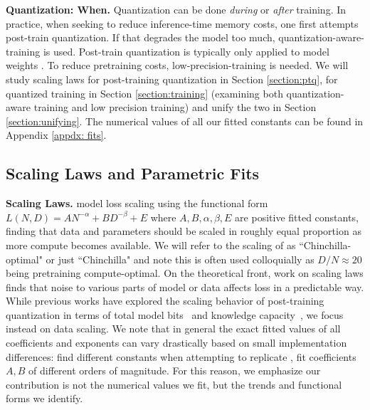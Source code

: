 \documentclass[11pt]{article}
\begin{document}
\textbf{Quantization: When.} Quantization can be done \textit{during} or \textit{after} training. In practice, when seeking to reduce inference-time memory costs, one first attempts post-train quantization. If that degrades the model too much, quantization-aware-training is used. Post-train quantization is typically only applied to model weights \citep{frantar2022gptq, dettmers2022gpt3, lin2023awq, xiao2023smoothquant}. To reduce pretraining costs, low-precision-training is needed. We will study scaling laws for post-training quantization in Section \ref{section:ptq}, for quantized training in Section \ref{section:training} (examining both quantization-aware training and low precision training) and unify the two in Section \ref{section:unifying}. The numerical values of all our fitted constants can be found in Appendix \ref{appdx: fits}.

\subsection{Scaling Laws and Parametric Fits}


\textbf{Scaling Laws.}  \citet{hoffmann2022training} model loss scaling using the functional form $L(N, D) = AN^{-\alpha} + BD^{-\beta} + E$ where $A, B, \alpha, \beta, E$ are positive fitted constants, finding that data and parameters should be scaled in roughly equal proportion as more compute becomes available. We will refer to the scaling of \citep{hoffmann2022training} as ``Chinchilla-optimal" or just ``Chinchilla" and note this is often used colloquially as $D/N \approx 20$ being pretraining compute-optimal. On the theoretical front, work on scaling laws \citep{bahri2024explaining, bordelon2024dynamical, lin2024scaling} finds that noise to various parts of model or data affects loss in a predictable way. While previous works have explored the scaling behavior of post-training quantization in terms of total model bits~\citep{dettmers2023case} and knowledge capacity~\citep{allen2024physics}, we focus instead on data scaling. We note that in general the exact fitted values of all coefficients and exponents can vary drastically based on small implementation differences: \citet{besiroglu2024chinchilla} find different constants when attempting to replicate \citep{hoffmann2022training}, \citet{sardana2023beyond} fit coefficients $A, B$ of different orders of magnitude. For this reason, we emphasize our contribution is not the numerical values we fit, but the trends and functional forms we identify. 
\end{document}
